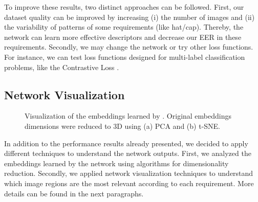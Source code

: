 To improve these results, two distinct approaches can be followed. First, our dataset quality can be improved by increasing (i) the number of images and (ii) the variability of patterns of some requirements (like hat/cap). Thereby, the network can learn more effective descriptors and decrease our EER in these requirements. Secondly, we may change the network or try other loss functions. For instance, we can test loss functions designed for multi-label classification problems, like the Contrastive Loss \cite{khosla2020supervised}.

\subsection{Network Visualization}

\begin{figure}[ht]
\centering
{}
\hfill
{}    
\caption{Visualization of the embeddings learned by \methodname. Original embeddings dimensions were reduced to 3D using (a) PCA and (b) t-SNE.}
\label{fig:embviz}
\end{figure}


In addition to the performance results already presented, we decided to apply different techniques to understand the network outputs. First, we analyzed the embeddings learned by the network using algorithms for dimensionality reduction. Secondly, we applied network visualization techniques to understand which image regions are the most relevant according to each requirement. More details can be found in the next paragraphs.

